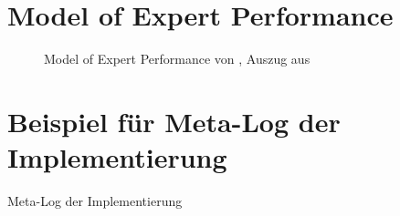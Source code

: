 \appendix
\clearpage
{}



\chapter{Model of Expert Performance}
\label{chap:ModelofExpert}

\begin{figure}[h]
    \centering
    \caption[Model of Expert Performance]{Model of Expert Performance von \citeauthor{crowleyFlexibleStrategyUse1993}, Auszug aus \cite[S. 536]{crowleyFlexibleStrategyUse1993}}
\end{figure}

\chapter{Beispiel für Meta-Log der Implementierung}
\label{chap:meta}
\begin{longlisting}
\caption{Meta-Log der Implementierung}
\label{listing:meta}
\inputminted{text}{04_Artefakte/03_Listings/meta.txt}
\end{longlisting}



